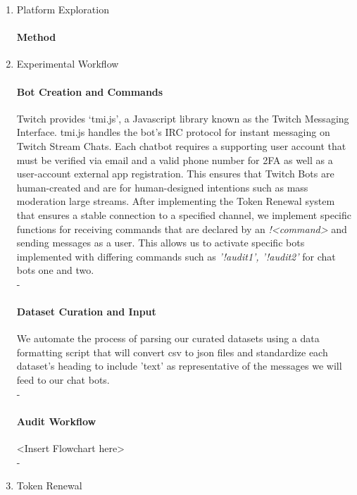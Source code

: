 \begin{enumerate}
\item Platform Exploration
\paragraph{\textbf{Method}}
\item Experimental Workflow
\paragraph{\textbf{Bot Creation and Commands}}
Twitch provides `tmi.js', a Javascript library known as the Twitch Messaging Interface. tmi.js handles the bot's IRC protocol for instant messaging on Twitch Stream Chats. Each chatbot requires a supporting user account that must be verified via email and a valid phone number for 2FA as well as a user-account external app registration. This ensures that Twitch Bots are human-created and are for human-designed intentions such as mass moderation large streams. After implementing the Token Renewal system that ensures a stable connection to a specified channel, we implement specific functions for receiving commands that are declared by an \textit{!<command>} and sending messages as a user. This allows us to activate specific bots implemented with differing commands such as \textit{'!audit1', '!audit2'} for chat bots one and two. \\
{\color{white}-} 
\paragraph{\textbf{Dataset Curation and Input}}
We automate the process of parsing our curated datasets using a data formatting script that will convert csv to json files and standardize each dataset's heading to include 'text' as representative of the messages we will feed to our chat bots.\\
{\color{white}-} 
\paragraph{\textbf{Audit Workflow}}
<Insert Flowchart here>
\\
{\color{white}-} 
\item Token Renewal

\end{enumerate}
